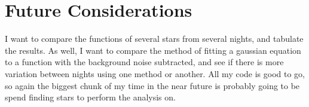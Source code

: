 \documentclass[11pt]{article}
\begin{document}
\section{Future Considerations}

I want to compare the functions of several stars from several nights, and tabulate the results. As well, I want to compare the method of fitting a gaussian equation to a function with the background noise subtracted, and see if there is more variation between nights using one method or another. All my code is good to go, so again the biggest chunk of my time in the near future is probably going to be spend finding stars to perform the analysis on.
\end{document}
